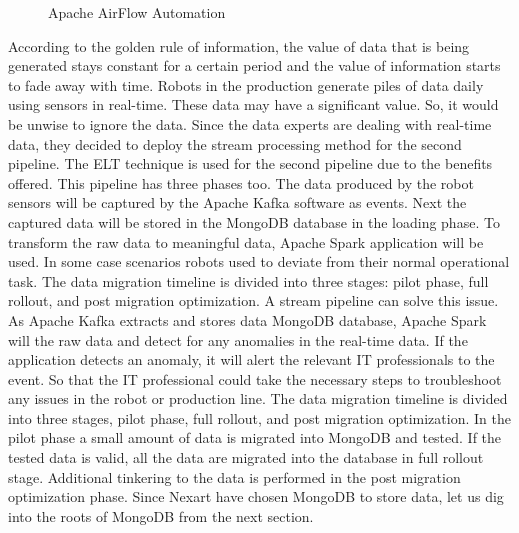 \documentclass[a4Paper,12pt]{report}
\begin{document}
\begin{figure}[H]
\centering
{}
\caption{Apache AirFlow Automation}
\end{figure}
According to the golden rule of information, the value of data that is being generated stays constant for a certain period and the value of information starts to fade away with time. Robots in the production generate piles of data daily using sensors in real-time. These data may have a significant value. So, it would be unwise to ignore the data. Since the data experts are dealing with real-time data, they decided to deploy the stream processing method for the second pipeline. The ELT technique is used for the second pipeline due to the benefits offered. This pipeline has three phases too. The data produced by the robot sensors will be captured by the Apache Kafka software as events. Next the captured data will be stored in the MongoDB database in the loading phase. To transform the raw data to meaningful data, Apache Spark application will be used. In some case scenarios robots used to deviate from their normal operational task. The data migration timeline is divided into three stages: pilot phase, full rollout, and post migration optimization. A stream pipeline can solve this issue. As Apache Kafka extracts and stores data MongoDB database, Apache Spark will the raw data and detect for any anomalies in the real-time data. If the application detects an anomaly, it will alert the relevant IT professionals to the event. So that the IT professional could take the necessary steps to troubleshoot any issues in the robot or production line. The data migration timeline is divided into three stages, pilot phase, full rollout, and post migration optimization. In the pilot phase a small amount of data is migrated into MongoDB and tested. If the tested data is valid, all the data are migrated into the database in full rollout stage. Additional tinkering to the data is performed in the post migration optimization phase. Since Nexart have chosen MongoDB to store data, let us dig into the roots of MongoDB from the next section.
\end{document}
